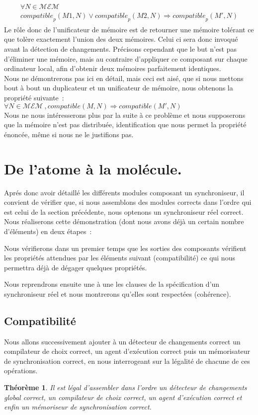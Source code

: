 \documentclass[11pt]{report}
\newtheorem{theor}{Th\'eor\`eme}
\newcommand{\mem}{\ensuremath{\mathcal{MEM}}}
\newcommand{\comp}[3]{\ensuremath{\mathit{compatible}_{#1}(#2, #3)}}
\newcommand{\compa}[2]{\ensuremath{\mathit{compatible}(#1, #2)}}
\begin{document}
{\[\begin{array}{ll}
\begin{array}{l}
\forall N \in \mem\ \\
\comp{p}{M1}{N} \vee \comp{p}{M2}{N} \Rightarrow \comp{p}{M'}{N}
\end{array}
\end{array}
\]
Le r\^ole donc de l'unificateur de m\'emoire est de retourner une m\'emoire 
tol\'erant ce que tol\`ere exactement l'union des deux m\'emoires. Celui ci 
sera donc invoqu\'e avant la d\'etection de changements. Pr\'ecisons 
cependant que le but n'est pas d'\'eliminer une m\'emoire, mais au contraire
d'appliquer ce composant sur chaque ordinateur local, afin d'obtenir
deux m\'emoires parfaitement identiques.\\
Nous ne d\'emontrerons pas ici en d\'etail, mais ceci est ais\'e, que si 
nous mettons bout \`a bout un duplicateur et un unificateur de m\'emoire, 
nous obtenons la propri\'et\'e suivante~:\\
$\forall N \in \mem\ , \compa{M}{N} \Rightarrow \compa{M'}{N}$\\
Nous ne nous int\'eresserons plus par la suite \`a ce probl\`eme et nous
supposerons que la 
m\'emoire n'est pas distribu\'ee, identification que nous permet la
propri\'et\'e \'enonc\'ee, m\^eme si nous ne le justifions pas.
\section{De l'atome \`a la mol\'ecule.}
\label{sec:coh}
Apr\'es donc avoir d\'etaill\'e les diff\'erents modules composant un synchroniseur, il convient
de v\'erifier que, si nous assemblons des modules corrects dans l'ordre qui est celui de la section 
pr\'ec\'edente, nous optenons un synchroniseur r\'eel correct.\\
Nous r\'ealiserons cette d\'emonstration (dont nous avons d\'ej\`a un certain
nombre d'\'el\'ements) en deux \'etapes~:\\
\begin{description}
\item Nous v\'erifierons dans un premier temps que les sorties des 
composants v\'erifient les propri\'et\'es attendues par les \'el\'ements 
suivant (compatibilit\'e) ce qui nous permettra
d\'ej\`a de d\'egager quelques propri\'et\'es.
\item Nous reprendrons ensuite une \`a une les clauses de la sp\'ecification d'un synchroniseur
r\'eel et nous montrerons qu'elles sont respect\'ees (coh\'erence).
\end{description} 
\subsection{Compatibilit\'e}
Nous allons successivement ajouter \`a un d\'etecteur de changements correct un compilateur de
choix correct, un agent d'ex\'ecution correct puis un m\'emorisateur de synchronisation correct,
en nous interrogeant sur la l\'egalit\'e de chacune de ces op\'erations.
\begin{theor}
 Il est l\'egal d'assembler dans l'ordre un d\'etecteur de changements
 global correct, un compilateur de choix correct, un agent d'ex\'ecution
 correct et enfin un m\'emoriseur de synchronisation correct.
\end{theor}
}
\end{document}

